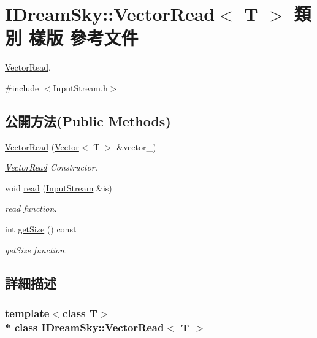 \hypertarget{class_i_dream_sky_1_1_vector_read}{}\section{I\+Dream\+Sky\+:\+:Vector\+Read$<$ T $>$ 類別 樣版 參考文件}
\label{class_i_dream_sky_1_1_vector_read}


\hyperlink{class_i_dream_sky_1_1_vector_read}{Vector\+Read}.  




{\ttfamily \#include $<$Input\+Stream.\+h$>$}

\subsection*{公開方法(Public Methods)}
\begin{DoxyCompactItemize}
\item 
\hyperlink{class_i_dream_sky_1_1_vector_read_a3ffb1f8c4f6d005d64926e4d23e4871c}{Vector\+Read} (\hyperlink{class_i_dream_sky_1_1_vector}{Vector}$<$ T $>$ \&vector\+\_\+)
\begin{DoxyCompactList}\small\item\em \hyperlink{class_i_dream_sky_1_1_vector_read}{Vector\+Read} Constructor. \end{DoxyCompactList}\item 
void \hyperlink{class_i_dream_sky_1_1_vector_read_a0d505bc9aa1e19a0599b30d30be5b28c}{read} (\hyperlink{class_i_dream_sky_1_1_input_stream}{Input\+Stream} \&is)
\begin{DoxyCompactList}\small\item\em read function. \end{DoxyCompactList}\item 
int \hyperlink{class_i_dream_sky_1_1_vector_read_a967f208733a51a3af66c623954e2148f}{get\+Size} () const 
\begin{DoxyCompactList}\small\item\em get\+Size function. \end{DoxyCompactList}\end{DoxyCompactItemize}


\subsection{詳細描述}
\subsubsection*{template$<$class T$>$\\*
class I\+Dream\+Sky\+::\+Vector\+Read$<$ T $>$}


